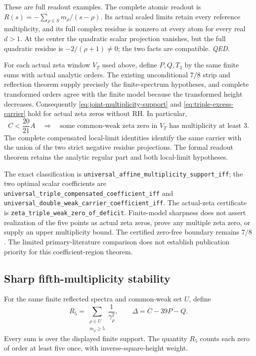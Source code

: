 These are full readout examples. The complete atomic readout is
\(R(s)=-\sum_{\rho\in S}m_\rho/(s-\rho)\). Its actual scaled limits
retain every reference multiplicity, and its full complex residue is
nonzero at every atom for every real \(d>1\).
At the center the quadratic scalar projection vanishes, but the full
quadratic residue is \(-2/(\rho+1)\ne0\); the two facts are compatible.
\hfill\textit{QED.}

For each actual zeta window \(V_T\) used above, define \(P,Q,T_3\) by
the same finite sums with actual analytic orders. The existing
unconditional \(7/8\) strip and reflection theorem supply precisely
the finite-spectrum hypotheses, and complete transformed orders agree
with the finite model because the transformed height decreases.
Consequently \eqref{eq:joint-multiplicity-support} and
\eqref{eq:triple-excess-carrier} hold for actual zeta zeros without RH.
In particular,
\[
 C<\frac{20}{21}A
 \quad\Longrightarrow\quad
 \text{some common-weak zeta zero in }V_T\text{ has multiplicity at least }3.
\]
The complete compensated local-limit identities identify the same
carrier with the union of the two strict negative residue projections.
The formal readout theorem retains the analytic regular part and both
local-limit hypotheses.

The exact classification is
\texttt{universal\_affine\_multiplicity\_support\_iff};
the two optimal scalar coefficients are
\texttt{universal\_triple\_compensated\_coefficient\_iff} and
\texttt{universal\_double\_weak\_carrier\_coefficient\_iff}.
The actual-zeta certificate is
\texttt{zeta\_triple\_weak\_zero\_of\_deficit}.
Finite-model sharpness does not assert realization of the five points
as actual zeta zeros, prove any multiple zeta zero, or supply an upper
multiplicity bound. The certified zero-free boundary remains \(7/8\).
The limited primary-literature comparison does not establish publication
priority for this coefficient-region theorem.

\subsection{Sharp fifth-multiplicity stability}
\label{sec:fifth-multiplicity-stability}

For the same finite reflected spectra and common-weak set \(U\), define
\[
 R_5=\sum_{\substack{\rho\in U\\m_\rho\ge5}}\frac1{\gamma_\rho^2},
 \qquad \Delta=C-39P-Q.
\]
Every sum is over the displayed finite support. The quantity \(R_5\)
counts each zero of order at least five once, with inverse-square-height
weight.

